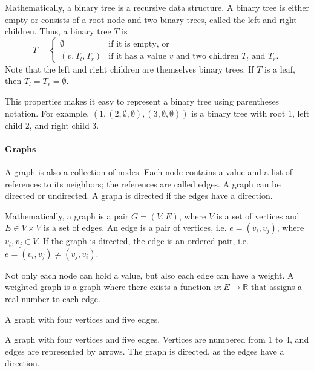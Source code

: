 Mathematically, a binary tree is a recursive data structure.  A binary tree is either
empty or consists of a root node and two binary trees, called the left and right
children.   Thus, a binary tree $T$ is
\[
  T = \begin{cases}
    \emptyset & \text{if it is empty, or} \\
    \left(v, T_l, T_r\right) & \text{if it has a value $v$ and two children $T_l$ and $T_r$.}
  \end{cases}
\]
Note that the left and right children are themselves binary trees.  If $T$ is a leaf,
then $T_l = T_r = \emptyset$.

This properties makes it easy to represent a binary tree using parentheses notation.  For
example, $(1, (2, \emptyset, \emptyset), (3, \emptyset, \emptyset))$ is a binary tree
with root $1$, left child $2$, and right child $3$.

\paragraph{Graphs}  A graph is also a collection of nodes.  Each node contains a value and a
list of references to its neighbors; the references are called edges.  A graph can be
directed or undirected.  A graph is directed if the edges have a direction.

Mathematically, a graph is a pair $G = (V, E)$, where $V$ is a set of vertices and $E \in
V \times V$ is a set of edges.  An edge is a pair of vertices, i.e. $e = (v_i, v_j)$,
where $v_i, v_j \in V$. If the graph is directed, the edge is an ordered pair, i.e. $e =
(v_i, v_j) \neq (v_j, v_i)$.

Not only each node can hold a value, but also each edge can have a weight.  A weighted
graph is a graph where there exists a function $w : E \rightarrow \mathbb{R}$ that assigns
a real number to each edge.

\begin{figurebox}[label=fig:graph]{A graph with four vertices and five edges.}
  \centering
  \tcblower
  A graph with four vertices and five edges.  Vertices are numbered from $1$ to $4$, and
  edges are represented by arrows.  The graph is directed, as the edges have a direction.
\end{figurebox}

